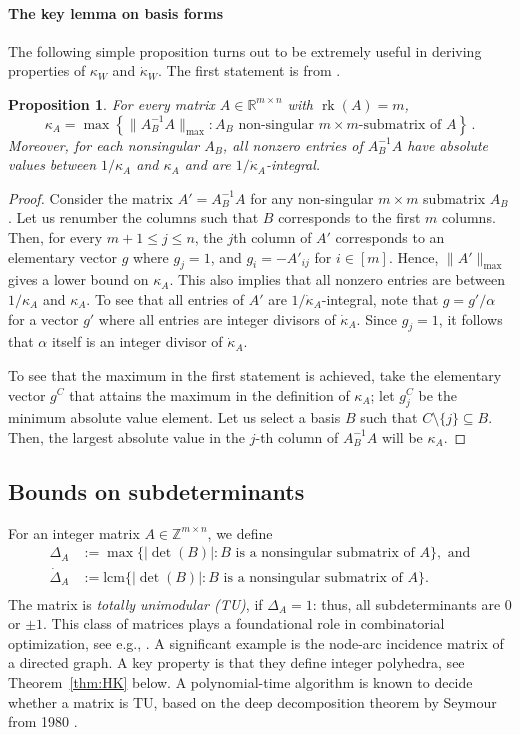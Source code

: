 \documentclass[11pt, a4paper]{article}
\newcommand{\Le}{\kappa}
\newcommand{\1}{\mathbbm{1}}
\newcommand{\rk}{\operatorname{rk}}
\newcommand{\kd}{{\dot{\kappa}}}
\newcommand{\lcm}{\mathrm{lcm}}
\newtheorem{prop}[theorem]{Proposition}
\theoremstyle{case}
\newcommand{\R}{\mathbb{R}}
\newcommand{\Z}{\mathbb{Z}}
\begin{document}
\paragraph{The key lemma on basis forms}
The following simple proposition turns out to be extremely useful in deriving properties of $\Le_W$ and $\kd_W$. The first statement is from \cite{DadushNV20}.
\begin{prop}\label{prop:kappa-max}
For every matrix $A\in \R^{m\times n}$ with $\rk(A) = m$,
\[
    \Le_A = \max\left\{ \|A_B^{-1} A\|_{\max} : A_B \text{ non-singular $m \times m$-submatrix of } A\right\}\, .
\]
Moreover, for each nonsingular $A_B$, all nonzero entries of $A_B^{-1} A$ have absolute values between $1/\Le_A$ and $\Le_A$ and are $1/\kd_A$-integral.
\end{prop} 
\begin{proof}
Consider the matrix $A'=A_B^{-1}A$ for any non-singular $m\times m$ submatrix $A_B$. Let us renumber the columns such that $B$ corresponds to the first $m$ columns. 
Then, for every $m+1\le j\le n$, the $j$th column of $A'$ corresponds to an elementary vector $g$ where $g_j=1$, and $g_i=-A'_{ij}$ for $i\in [m]$. Hence, $\|A'\|_{\max}$ gives a lower bound on $\Le_A$. This also implies that all nonzero entries are between $1/\Le_A$ and $\Le_A$. To see that all entries of $A'$ are $1/\kd_A$-integral, note that $g=g'/\alpha$ for a vector $g'$ where all entries are integer divisors of $\dot\kappa_A$. Since $g_j=1$, it follows that $\alpha$ itself is an integer divisor of $\kd_A$.

To see that the maximum in the first statement is achieved, take the elementary vector $g^C$ that attains the maximum in the definition of $\Le_A$; let $g_j^C$ be the minimum absolute value element.
Let us select a basis $B$ such that $C\setminus \{j\}\subseteq B$. Then, the largest absolute value in the $j$-th column of $A_B^{-1}A$ will be $\Le_A$.
\end{proof}

\subsection{Bounds on subdeterminants}\label{sec:subdet}
For an integer matrix $A\in \Z^{m\times n}$, we define 
\begin{equation}
\begin{aligned}
  \Delta_A &:= \max \{|\det(B)|: B \text{ is a  nonsingular submatrix of } A\},\mbox{ and}\\
  \dot\Delta_A &:=\lcm \{|\det(B)|: B \text{ is a nonsingular submatrix of } A\}.\\
  \end{aligned}
\end{equation} 
The matrix is \emph{totally unimodular (TU)}, if $\Delta_A=1$: thus, all subdeterminants are $0$ or $\pm 1$. This class of matrices plays a foundational role in combinatorial optimization,  see e.g., \cite[Chapters 19-20]{SchrijverLPIP}. A significant example is the node-arc incidence matrix of a directed graph. A key property is that they define integer polyhedra, see Theorem~\ref{thm:HK} below.
A polynomial-time algorithm is known to decide whether a matrix is TU, 
based on the deep decomposition theorem by Seymour from 1980 \cite{Seymour1980}.
\end{document}
